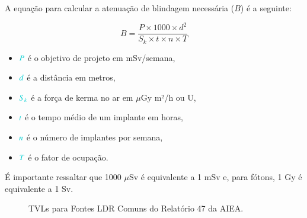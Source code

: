 \documentclass[11pt,a4paper]{article}
\newcounter{exemplo}
\begin{document}
	A equação para calcular a atenuação de blindagem necessária ($B$) é a seguinte:

	\begin{equation}
		B = \frac{{P \times 1000 \times d^2}}{{S_k \times t \times n \times T}}
	\end{equation}

	\begin{exemplo}[Onde:]
		\begin{itemize}
			\item $\textcolor{DarkTurquoise}{P}$ é o objetivo de projeto em mSv/semana,
			\item $\textcolor{DarkTurquoise}{d}$ é a distância em metros,
			\item $\textcolor{DarkTurquoise}{S_k}$ é a força de kerma no ar em $\mu$Gy m²/h ou U,
			\item $\textcolor{DarkTurquoise}{t}$ é o tempo médio de um implante em horas,
			\item $\textcolor{DarkTurquoise}{n}$ é o número de implantes por semana,
			\item $\textcolor{DarkTurquoise}{T}$ é o fator de ocupação.
		\end{itemize}
	\end{exemplo}

	É importante ressaltar que 1000 $\mu$Sv é equivalente a 1 mSv e, para fótons, 1 Gy é equivalente a 1 Sv.

		\begin{figure}[!h]
			\centering
			\caption{TVLs para Fontes LDR Comuns do Relatório 47 da AIEA.}
			\label{fig:prTransLDR}
		\end{figure}
\end{document}
